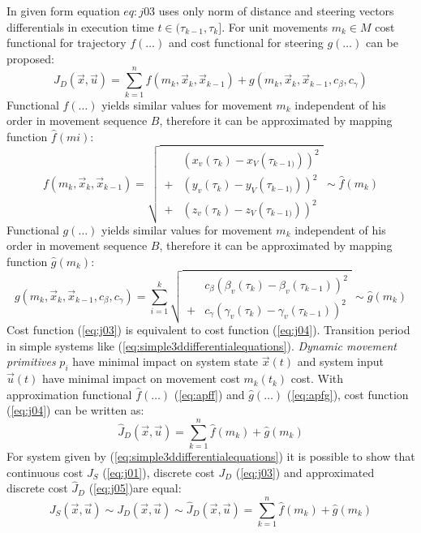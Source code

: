 In given form equation $eq:j03$ uses only norm of distance and steering vectors differentials in execution time $t\in(\tau_{k-1},\tau_{k}]$. For unit movements $m_k\in M$ cost functional for trajectory $f(\dots)$ and cost functional for steering $g(\dots)$ can be proposed:
\begin{equation}\label{eq:j04}
    J_D(\vec{x},\vec{u}) = \sum_{k=1}^n f(m_k,\vec{x}_k,\vec{x}_{k-1}) + g(m_k,\vec{x}_k,\vec{x}_{k-1},c_\beta,c_\gamma)
\end{equation}
Functional $f(\dots)$ yields similar values for movement $m_k$ independent of his order in movement sequence $B$, therefore it can be approximated by mapping function $\hat{f}(mi)$:
\begin{equation}\label{eq:apff}
    f(m_k,\vec{x}_k,\vec{x}_{k-1})= \sqrt{\begin{aligned}
        &\left(x_v(\tau_{k})-x_V(\tau_{k-1)})\right)^2\\
        +&\left(y_v(\tau_{k})-y_V(\tau_{k-1)})\right)^2\\
        +&\left(z_v(\tau_{k})-z_V(\tau_{k-1)})\right)^2
    \end{aligned}}
    \sim \hat{f}(m_k)
\end{equation}
Functional $g(\dots)$ yields similar values for movement $m_k$ independent of his order in movement sequence $B$, therefore it can be approximated by mapping function $\hat{g}(m_k)$:
\begin{equation}\label{eq:apfg}
    g(m_k,\vec{x}_k,\vec{x}_{k-1},c_\beta,c_\gamma) = \sum_{i=1}^k \sqrt{
    \begin{aligned}
        &c_\beta\left(\beta_v(\tau_{k})-\beta_v(\tau_{k-1})\right)^2\\
        +&c_\gamma\left(\gamma_v(\tau_{k})-\gamma_v(\tau_{k-1})\right)^2
    \end{aligned}}
    \sim \hat{g}(m_k)
\end{equation}
Cost function (\ref{eq:j03}) is equivalent to cost function (\ref{eq:j04}). Transition period in simple systems like (\ref{eq:simple3ddifferentialequations}). \textit{Dynamic movement primitives} $p_i$ have minimal impact on system state $\vec{x}(t)$ and system input $\vec{u}(t)$ have minimal impact on movement cost $m_k(t_k)$ cost. With approximation functional $\hat{f}(\dots)$ (\ref{eq:apff}) and $\hat{g}(\dots)$ (\ref{eq:apfg}), cost function (\ref{eq:j04}) can be written as:
\begin{equation}\label{eq:j05}
    \hat{J}_D(\vec{x},\vec{u}) = \sum_{k=1}^n \hat{f}(m_k) + \hat{g}(m_k)
\end{equation}
For system given by (\ref{eq:simple3ddifferentialequations}) it is possible to show that continuous cost $J_S$ (\ref{eq:j01}), discrete cost $J_D$ (\ref{eq:j03}) and approximated discrete cost $\hat{J}_D$ (\ref{eq:j05})are equal:
\begin{equation}
    J_S(\vec{x},\vec{u}) \sim J_D(\vec{x},\vec{u})\sim \hat{J}_D(\vec{x},\vec{u}) = \sum_{k=1}^n \hat{f}(m_k) + \hat{g}(m_k)
\end{equation}

